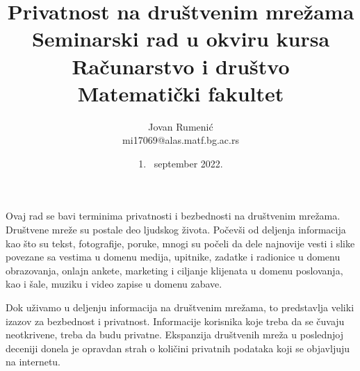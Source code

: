 \documentclass[a4paper]{article}
\begin{document}
\title{Privatnost na društvenim mrežama\\ \small{Seminarski rad u okviru kursa\\Računarstvo i društvo\\ Matematički fakultet}}

\author{Jovan Rumenić\\ mi17069@alas.matf.bg.ac.rs}
\date{1. ~september 2022. }
\maketitle

\abstract
Ovaj rad se bavi terminima privatnosti i bezbednosti na društvenim mrežama. Društvene mreže su postale deo ljudskog života. Počevši od deljenja informacija kao što su tekst, fotografije, poruke, mnogi su počeli da dele najnovije vesti i slike povezane sa vestima u domenu medija, upitnike, zadatke i radionice u domenu obrazovanja, onlajn ankete, marketing i ciljanje klijenata u domenu poslovanja, kao i šale, muziku i video zapise u domenu zabave.\par Dok uživamo u deljenju informacija na društvenim mrežama, to predstavlja veliki izazov za bezbednost i privatnost. Informacije korisnika koje treba da se čuvaju neotkrivene, treba da budu privatne. Ekspanzija društvenih mreža u poslednjoj deceniji donela je opravdan strah o količini privatnih podataka koji se objavljuju  na  internetu.

\newpage
\tableofcontents
\newpage
\end{document}
